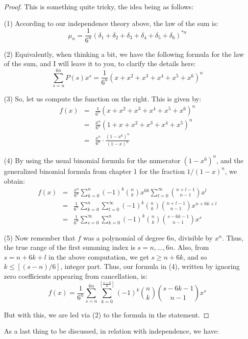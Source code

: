 \documentclass[12pt]{amsbook}
\begin{document}
\begin{proof}
This is something quite tricky, the idea being as follows:

\medskip

(1) According to our independence theory above, the law of the sum is:
$$\mu_n=\frac{1}{6^n}(\delta_1+\delta_2+\delta_3+\delta_4+\delta_5+\delta_6)^{*n}$$

(2) Equivalently, when thinking a bit, we have the following formula for the law of the sum, and I will leave it to you, to clarify the details here:
$$\sum_{s=n}^{6n}P(s)x^s=\frac{1}{6^n}(x+x^2+x^3+x^4+x^5+x^6)^n$$

(3) So, let us compute the function on the right. This is given by:
\begin{eqnarray*}
f(x)
&=&\frac{1}{6^n}(x+x^2+x^3+x^4+x^5+x^6)^n\\
&=&\frac{x^n}{6^n}(1+x+x^2+x^3+x^4+x^5)^n\\
&=&\frac{x^n}{6^n}\cdot\frac{(1-x^6)^n}{(1-x)^n}
\end{eqnarray*}

(4) By using the usual binomial formula for the numerator $(1-x^6)^n$, and the generalized  binomial formula from chapter 1 for the fraction $1/(1-x)^n$, we obtain:
\begin{eqnarray*}
f(x)
&=&\frac{x^n}{6^n}\sum_{k=0}^n(-1)^k\binom{n}{k}x^{6k}\sum_{l=0}^\infty\binom{n+l-1}{n-1}x^l\\
&=&\frac{1}{6^n}\sum_{k=0}^n\sum_{l=0}^\infty(-1)^k\binom{n}{k}\binom{n+l-1}{n-1}x^{n+6k+l}\\
&=&\frac{1}{6^n}\sum_{s=0}^\infty\sum_{k=0}^n(-1)^k\binom{n}{k}\binom{s-6k-1}{n-1}x^s
\end{eqnarray*}

(5) Now remember that $f$ was a polynomial of degree $6n$, divisible by $x^n$. Thus, the true range of the first summing index is $s=n,\ldots,6n$. Also, from $s=n+6k+l$ in the above computation, we get $s\geq n+6k$, and so $k\leq[(s-n)/6]$, integer part. Thus, our formula in (4), written by ignoring zero coefficients appearing from cancellation, is:
$$f(x)=\frac{1}{6^n}\sum_{s=n}^{6n}\sum_{k=0}^{[\frac{s-n}{6}]}(-1)^k\binom{n}{k}\binom{s-6k-1}{n-1}x^s$$

But with this, we are led via (2) to the formula in the statement.
\end{proof} 

As a last thing to be discussed, in relation with independence, we have:
\end{document}
